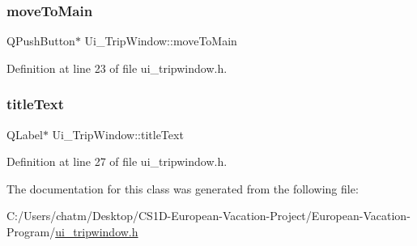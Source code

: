 \subsubsection{\texorpdfstring{moveToMain}{moveToMain}}
{\footnotesize\ttfamily Q\+Push\+Button$\ast$ Ui\+\_\+\+Trip\+Window\+::move\+To\+Main}



Definition at line 23 of file ui\+\_\+tripwindow.\+h.

\mbox{\label{class_ui___trip_window_a45b26400477d661fbb99a67999ac4035}} 
\subsubsection{\texorpdfstring{titleText}{titleText}}
{\footnotesize\ttfamily Q\+Label$\ast$ Ui\+\_\+\+Trip\+Window\+::title\+Text}



Definition at line 27 of file ui\+\_\+tripwindow.\+h.



The documentation for this class was generated from the following file\+:\begin{DoxyCompactItemize}
\item 
C\+:/\+Users/chatm/\+Desktop/\+C\+S1\+D-\/\+European-\/\+Vacation-\/\+Project/\+European-\/\+Vacation-\/\+Program/\mbox{\hyperlink{ui__tripwindow_8h}{ui\+\_\+tripwindow.\+h}}\end{DoxyCompactItemize}

